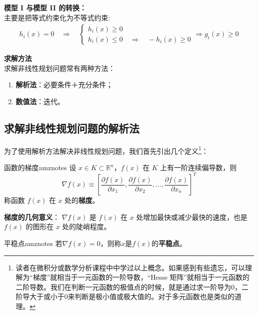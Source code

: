 \begin{notebox}{\textbf{模型 I 与模型 II 的转换：}}
\\
主要是把等式约束化为不等式约束:
\begin{align*}
    h_i(x) = 0 \quad \Rightarrow \quad \begin{cases}
        h_i(x) \geq 0 \\
        h_i(x) \leq 0 \quad \Rightarrow \quad -h_i(x) \geq 0
    \end{cases}
    \Rightarrow
    g_i(x)\geq 0 
\end{align*}
\end{notebox}
\begin{notebox}{\textbf{求解方法}}
    \\求解非线性规划问题常有两种方法：
    \begin{enumerate}
        \item \textbf{解析法}：必要条件＋充分条件；
        \item \textbf{数值法}：迭代。
    \end{enumerate}
\end{notebox}


\subsection{求解非线性规划问题的解析法}
为了使用解析方法解决非线性规划问题，我们首先引出几个定义\footnote{读者在微积分或数学分析课程中中学过以上概念。如果感到有些遗忘，可以理解为“梯度”就相当于一元函数的一阶导数，“Hesse 矩阵”就相当于一元函数的二阶导数。我们在判断一元函数的极值点的时候，就是通过求一阶导为0，二阶导大于或小于0来判断是极小值或极大值的。对于多元函数也是类似的道理。}：
\begin{dfnbox}{函数的梯度}{amznotes}
    设 $x \in K \subset \mathbb{R}^n$，$f(x)$ 在 $K$ 上有一阶连续偏导数，则
    \[
    \nabla f(x) \equiv \left[ \frac{\partial f(x)}{\partial x_1}, \frac{\partial f(x)}{\partial x_2}, \ldots, \frac{\partial f(x)}{\partial x_n} \right]^T
    \]
    称函数 $f(x)$ 在 $x$ 处的\textbf{梯度}。
\end{dfnbox}
\textbf{梯度的几何意义}：
    $\nabla f(x)$ 是 $f(x)$ 在 $x$ 处增加最快或减少最快的速度，也是 $f(x)$ 的图形在 $x$ 处的陡峭程度。
\begin{dfnbox}{平稳点}{amznotes}
    若$\nabla f(x)=0$，则称$x$是$f(x)$的\textbf{平稳点}。
\end{dfnbox}


